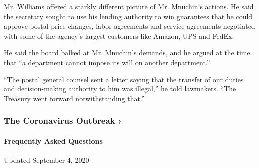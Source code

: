 Mr. Williams offered a starkly different picture of Mr. Mnuchin's
actions. He said the secretary sought to use his lending authority to
win guarantees that he could approve postal price changes, labor
agreements and service agreements negotiated with some of the agency's
largest customers like Amazon, UPS and FedEx.

He said the board balked at Mr. Mnuchin's demands, and he argued at the
time that ``a department cannot impose its will on another department.''

``The postal general counsel sent a letter saying that the transfer of
our duties and decision-making authority to him was illegal,'' he told
lawmakers. ``The Treasury went forward notwithstanding that.''

\href{https://www.nytimes3xbfgragh.onion/news-event/coronavirus?action=click\&pgtype=Article\&state=default\&region=MAIN_CONTENT_3\&context=storylines_faq}{}

\hypertarget{the-coronavirus-outbreak-}{%
\subsubsection{The Coronavirus Outbreak
›}\label{the-coronavirus-outbreak-}}

\hypertarget{frequently-asked-questions}{%
\paragraph{Frequently Asked
Questions}\label{frequently-asked-questions}}

Updated September 4, 2020

